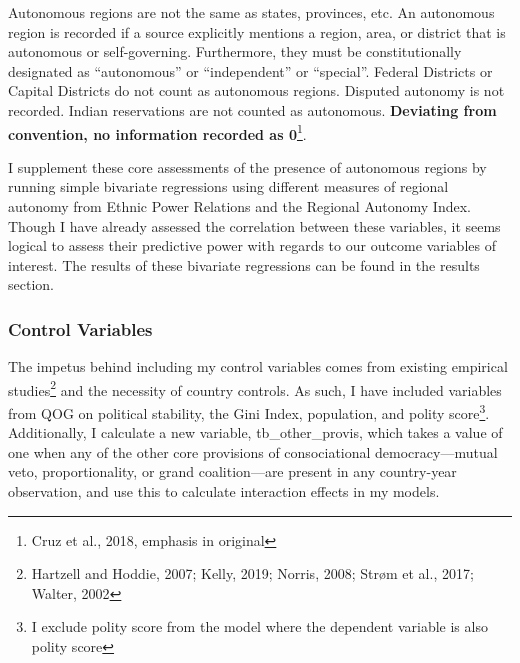 \documentclass[12pt]{article}
\begin{document}
\singlespacing
Autonomous regions are not the same as states, provinces, etc. An autonomous region is recorded if a source explicitly mentions a region, area, or district that is autonomous or self-governing. Furthermore, they must be constitutionally designated as ``autonomous'' or ``independent'' or ``special''. Federal Districts or Capital Districts do not count as autonomous regions. Disputed autonomy is not recorded. Indian reservations are not counted as autonomous. \textbf{Deviating from convention, no information recorded as 0}\footnote{Cruz et al., 2018, emphasis in original}.

\doublespacing
I supplement these core assessments of the presence of autonomous regions by running simple bivariate regressions using different measures of regional autonomy from Ethnic Power Relations and the Regional Autonomy Index. Though I have already assessed the correlation between these variables, it seems logical to assess their predictive power with regards to our outcome variables of interest. The results of these bivariate regressions can be found in the results section. 

\subsubsection{Control Variables} 
The impetus behind including my control variables comes from existing empirical studies\footnote{Hartzell and Hoddie, 2007; Kelly, 2019; Norris, 2008; Strøm et al., 2017; Walter, 2002} and the necessity of country controls. As such, I have included variables from QOG on political stability, the Gini Index, population, and polity score\footnote{I exclude polity score from the model where the dependent variable is also polity score}. Additionally, I calculate a new variable, tb\_other\_provis, which takes a value of one when any of the other core provisions of consociational democracy---mutual veto, proportionality, or grand coalition---are present in any country-year observation, and use this to calculate interaction effects in my models. 
\end{document}
